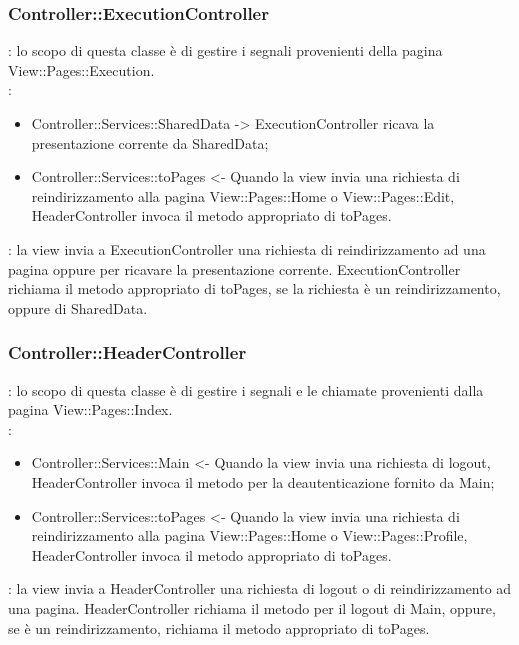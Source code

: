 {	\subsubsection{Controller::\-ExecutionController}{
		\textbf{\tipo}: lo scopo di questa classe è di gestire i segnali provenienti della pagina View::\-Pages::\-Execution.\\	
		\textbf{\relaz}:
		\begin{itemize}
			\item Controller::\-Services::\-SharedData -> ExecutionController ricava la presentazione corrente da SharedData;
			\item Controller::\-Services::\-toPages <- Quando la view invia una richiesta di reindirizzamento alla pagina View::\-Pages::\-Home o View::\-Pages::\-Edit, HeaderController invoca il metodo appropriato di toPages.
		\end{itemize}
		\textbf{\interfacce}: la view invia a ExecutionController una richiesta di reindirizzamento ad una pagina oppure per ricavare la presentazione corrente. ExecutionController richiama il metodo appropriato di toPages, se la richiesta è un reindirizzamento, oppure di SharedData.
	}
	
	\subsubsection{Controller::\-HeaderController}{
		\textbf{\tipo}: lo scopo di questa classe è di gestire i segnali e le chiamate provenienti dalla pagina View::\-Pages::\-Index.\\	
		\textbf{\relaz}:
		\begin{itemize}
			\item Controller::\-Services::\-Main <- Quando la view invia una richiesta di logout, HeaderController invoca il metodo per la deautenticazione fornito da Main;
			\item Controller::\-Services::\-toPages <- Quando la view invia una richiesta di reindirizzamento alla pagina View::\-Pages::\-Home o View::\-Pages::\-Profile, HeaderController invoca il metodo appropriato di toPages.
		\end{itemize}
		\textbf{\interfacce}: la view invia a HeaderController una richiesta di logout o di reindirizzamento ad una pagina. HeaderController richiama il metodo per il logout di Main, oppure, se è un reindirizzamento, richiama il metodo appropriato di toPages.
	}

}
